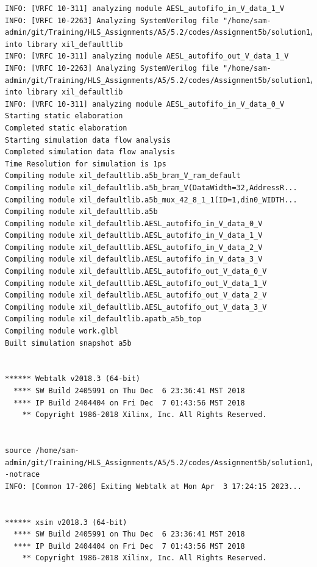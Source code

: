 \documentclass{article}
\begin{document}
\begin{lstlisting}
INFO: [VRFC 10-311] analyzing module AESL_autofifo_in_V_data_1_V
INFO: [VRFC 10-2263] Analyzing SystemVerilog file "/home/sam-admin/git/Training/HLS_Assignments/A5/5.2/codes/Assignment5b/solution1/sim/verilog/AESL_autofifo_out_V_data_1_V.v" into library xil_defaultlib
INFO: [VRFC 10-311] analyzing module AESL_autofifo_out_V_data_1_V
INFO: [VRFC 10-2263] Analyzing SystemVerilog file "/home/sam-admin/git/Training/HLS_Assignments/A5/5.2/codes/Assignment5b/solution1/sim/verilog/AESL_autofifo_in_V_data_0_V.v" into library xil_defaultlib
INFO: [VRFC 10-311] analyzing module AESL_autofifo_in_V_data_0_V
Starting static elaboration
Completed static elaboration
Starting simulation data flow analysis
Completed simulation data flow analysis
Time Resolution for simulation is 1ps
Compiling module xil_defaultlib.a5b_bram_V_ram_default
Compiling module xil_defaultlib.a5b_bram_V(DataWidth=32,AddressR...
Compiling module xil_defaultlib.a5b_mux_42_8_1_1(ID=1,din0_WIDTH...
Compiling module xil_defaultlib.a5b
Compiling module xil_defaultlib.AESL_autofifo_in_V_data_0_V
Compiling module xil_defaultlib.AESL_autofifo_in_V_data_1_V
Compiling module xil_defaultlib.AESL_autofifo_in_V_data_2_V
Compiling module xil_defaultlib.AESL_autofifo_in_V_data_3_V
Compiling module xil_defaultlib.AESL_autofifo_out_V_data_0_V
Compiling module xil_defaultlib.AESL_autofifo_out_V_data_1_V
Compiling module xil_defaultlib.AESL_autofifo_out_V_data_2_V
Compiling module xil_defaultlib.AESL_autofifo_out_V_data_3_V
Compiling module xil_defaultlib.apatb_a5b_top
Compiling module work.glbl
Built simulation snapshot a5b


****** Webtalk v2018.3 (64-bit)
  **** SW Build 2405991 on Thu Dec  6 23:36:41 MST 2018
  **** IP Build 2404404 on Fri Dec  7 01:43:56 MST 2018
    ** Copyright 1986-2018 Xilinx, Inc. All Rights Reserved.


source /home/sam-admin/git/Training/HLS_Assignments/A5/5.2/codes/Assignment5b/solution1/sim/verilog/xsim.dir/a5b/webtalk/xsim_webtalk.tcl -notrace
INFO: [Common 17-206] Exiting Webtalk at Mon Apr  3 17:24:15 2023...


****** xsim v2018.3 (64-bit)
  **** SW Build 2405991 on Thu Dec  6 23:36:41 MST 2018
  **** IP Build 2404404 on Fri Dec  7 01:43:56 MST 2018
    ** Copyright 1986-2018 Xilinx, Inc. All Rights Reserved.



\end{lstlisting}
\end{document}
